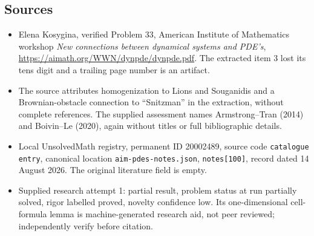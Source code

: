 \documentclass[11pt]{article}
\begin{document}
\subsection{Sources}
\begin{itemize}
\item Elena Kosygina, verified Problem 33, American Institute of Mathematics workshop \emph{New connections between dynamical systems and PDE's}, \url{https://aimath.org/WWN/dynpde/dynpde.pdf}. The extracted item 3 lost its tens digit and a trailing page number is an artifact.
\item The source attributes homogenization to Lions and Souganidis and a Brownian-obstacle connection to ``Snitzman'' in the extraction, without complete references. The supplied assessment names Armstrong--Tran (2014) and Boivin--Le (2020), again without titles or full bibliographic details.
\item Local UnsolvedMath registry, permanent ID 20002489, source code \texttt{catalogue entry}, canonical location \texttt{aim-pdes-notes.json}, \texttt{notes[100]}, record dated 14 August 2026. The original literature field is empty.
\item Supplied research attempt 1: partial result, problem status at run partially solved, rigor labelled proved, novelty confidence low. Its one-dimensional cell-formula lemma is machine-generated research aid, not peer reviewed; independently verify before citation.
\end{itemize}
\end{document}
